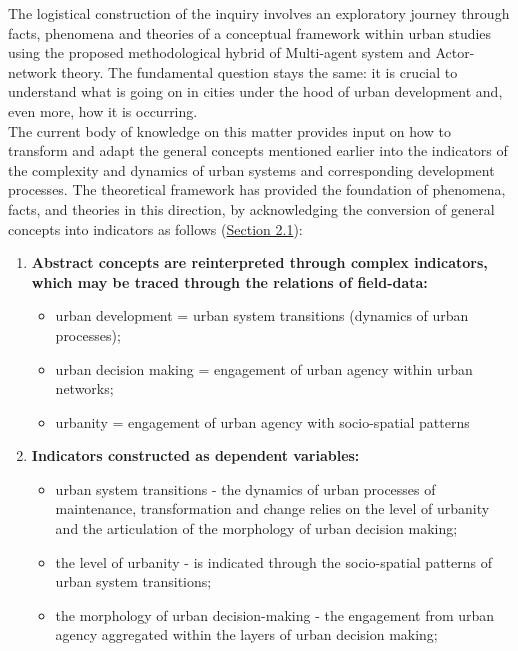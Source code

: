 \documentclass[11pt]{report}
\begin{document}
{{{{The logistical construction of the inquiry involves an exploratory journey through facts, phenomena and theories of a conceptual framework within urban studies using the proposed methodological hybrid of Multi-agent system and Actor-network theory. The fundamental question stays the same: it is crucial to understand what is going on in cities under the hood of urban development and, even more, how it is occurring.
\\

The current body of knowledge on this matter provides input on how to transform and adapt the general concepts mentioned earlier into the indicators of the complexity and dynamics of urban systems and corresponding development processes. The theoretical framework has provided the foundation of phenomena, facts, and theories in this direction, by acknowledging the conversion of general concepts into indicators as follows (\href{Section 2.1}{Section 2.1}):

\begin{enumerate}
\item \textbf{Abstract concepts are reinterpreted through complex indicators, which may be traced through the relations of field-data:}

\begin{itemize}
\item urban development = urban system transitions (dynamics of urban processes);
\item urban decision making = engagement of urban agency within urban networks;
\item urbanity = engagement of urban agency with socio-spatial patterns
\end{itemize}

\item \textbf{Indicators constructed as dependent variables:}
\begin{itemize}
\item urban system transitions - the dynamics of urban processes of maintenance, transformation and change relies on the level of urbanity and the articulation of the morphology of urban decision making;
\item the level of urbanity - is indicated through the socio-spatial patterns of urban system transitions;
\item the morphology of urban decision-making - the engagement from urban agency aggregated within the layers of urban decision making;
\end{itemize}


\end{enumerate}}}}}
\end{document}
